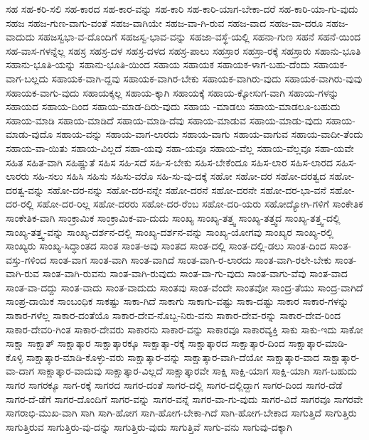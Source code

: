 {ಸಹ
ಸಹ-ಕರಿ-ಸಲಿ
ಸಹ-ಕಾರದ
ಸಹ-ಕಾರ-ವನ್ನು
ಸಹ-ಕಾರಿ
ಸಹ-ಕಾರಿ-ಯಾಗ-ಬೇಕಾ-ದರೆ
ಸಹ-ಕಾರಿ-ಯಾ-ಗು-ವುದು
ಸಹಜ
ಸಹಜ-ಗುಣ-ವಾಗು-ವಂತೆ
ಸಹಜ-ವಾಗಿಯೇ
ಸಹಜ-ವಾ-ಗಿ-ರುವ
ಸಹಜ-ವಾದ
ಸಹಜ-ವಾ-ದರೂ
ಸಹಜ-ವಾದುದು
ಸಹಜಸ್ವಭಾ-ವ-ದೊಂದಿಗೆ
ಸಹಜಸ್ವ-ಭಾವ-ವನ್ನು
ಸಹಜಾ-ವಸ್ಥೆ-ಯಲ್ಲಿ
ಸಹನಾ-ಗುಣ
ಸಹನೆ
ಸಹನೆ-ಯಿಂದ
ಸಹ-ವಾಸ-ಗಳನ್ನೆಲ್ಲ
ಸಹಸ್ರ
ಸಹಸ್ರ-ದಳ
ಸಹಸ್ರ-ದಳದ
ಸಹಸ್ರ-ಪಾಲು
ಸಹಸ್ರಾರ
ಸಹಸ್ರಾ-ರಕ್ಕೆ
ಸಹಸ್ರಾರು
ಸಹಾನು-ಭೂತಿ
ಸಹಾನು-ಭೂತಿ-ಯನ್ನು
ಸಹಾನು-ಭೂತಿ-ಯಿಂದ
ಸಹಾಯ
ಸಹಾಯಕ
ಸಹಾಯಕ-ಳಾಗ-ಬಹು-ದೆಂದು
ಸಹಾಯಕ-ವಾಗ-ಬಲ್ಲದು
ಸಹಾಯಕ-ವಾಗಿ-ದ್ದವು
ಸಹಾಯಕ-ವಾಗಿರ-ಬೇಕು
ಸಹಾಯಕ-ವಾಗಿರು-ವುದು
ಸಹಾಯಕ-ವಾಗಿರು-ವುವು
ಸಹಾಯಕ-ವಾಗು-ವುದು
ಸಹಾಯಕ್ಕಲ್ಲ
ಸಹಾಯ-ಕ್ಕಾಗಿ
ಸಹಾಯಕ್ಕೆ
ಸಹಾಯ-ಕ್ಕೋಸುಗ-ವಾಗಿ
ಸಹಾಯ-ಗಳನ್ನು
ಸಹಾಯದ
ಸಹಾಯ-ದಿಂದ
ಸಹಾಯ-ಮಾಡ-ದಿರು-ವುದು
ಸಹಾಯ	-ಮಾಡಲು
ಸಹಾಯ-ಮಾಡಲೂ-ಬಹುದು
ಸಹಾಯ-ಮಾಡಿ
ಸಹಾಯ-ಮಾಡಿದೆ
ಸಹಾಯ-ಮಾಡಿ-ದೆವು
ಸಹಾಯ-ಮಾಡುವ
ಸಹಾಯ-ಮಾಡು-ವುದು
ಸಹಾಯ-ಮಾಡು-ವುದೊ
ಸಹಾಯ-ವನ್ನು
ಸಹಾಯ-ವಾಗ-ಲಾರದು
ಸಹಾಯ-ವಾಗು
ಸಹಾಯ-ವಾಗುವ
ಸಹಾಯ-ವಾದೀ-ತೆಂದು
ಸಹಾಯ-ವಾ-ಯಿತು
ಸಹಾಯ-ವಿಲ್ಲದೆ
ಸಹಾ-ಯವು
ಸಹಾ-ಯವೂ
ಸಹಾಯ-ವೆಲ್ಲ
ಸಹಾಯ-ವೆಲ್ಲವೂ
ಸಹಾ-ಯವೇ
ಸಹಿತ
ಸಹಿತ-ವಾಗಿ
ಸಹಿಷ್ಣುತೆ
ಸಹಿಸ
ಸಹಿ-ಸದೆ
ಸಹಿ-ಸ-ಬೇಕು
ಸಹಿಸ-ಬೇಕೆಂದೂ
ಸಹಿಸ-ಲಾರ
ಸಹಿಸ-ಲಾರದ
ಸಹಿಸ-ಲಾರರು
ಸಹಿ-ಸಲು
ಸಹಿಸಿ
ಸಹಿಸು
ಸಹಿಸು-ವರೊ
ಸಹಿ-ಸು-ವು-ದಕ್ಕೆ
ಸಹೋ
ಸಹೋ-ದರ
ಸಹೋ-ದರತ್ವದ
ಸಹೋ-ದರತ್ವ-ವನ್ನು
ಸಹೋ-ದರ-ನನ್ನು
ಸಹೋ-ದರ-ನನ್ನೇ
ಸಹೋ-ದರನೆ
ಸಹೋ-ದರನೇ
ಸಹೋ-ದರ-ಭಾ-ವನೆ
ಸಹೋ-ದರ-ರಲ್ಲಿ
ಸಹೋ-ದರ-ರಿಲ್ಲ
ಸಹೋ-ದರರು
ಸಹೋ-ದರ-ರೆಂಬ
ಸಹೋ-ದರಿ-ಯರು
ಸಹೋದ್ಯೋಗಿ-ಗಳಿಗೆ
ಸಾಂಕೇತಿಕ
ಸಾಂಕೇತಿಕ-ವಾಗಿ
ಸಾಂಕ್ರಾಮಿಕ
ಸಾಂಕ್ರಾಮಿಕ-ವಾ-ದುದು
ಸಾಂಖ್ಯ
ಸಾಂಖ್ಯ-ತತ್ತ್ವ
ಸಾಂಖ್ಯ-ತತ್ತ್ವದ
ಸಾಂಖ್ಯ-ತತ್ತ್ವ-ದಲ್ಲಿ
ಸಾಂಖ್ಯ-ತತ್ತ್ವ-ವನ್ನು
ಸಾಂಖ್ಯ-ದರ್ಶನ-ದಲ್ಲಿ
ಸಾಂಖ್ಯ-ದರ್ಶನ-ವನ್ನು
ಸಾಂಖ್ಯ-ಯೋಗವು
ಸಾಂಖ್ಯರ
ಸಾಂಖ್ಯ-ರಲ್ಲಿ
ಸಾಂಖ್ಯರು
ಸಾಂಖ್ಯ-ಸಿದ್ಧಾಂತದ
ಸಾಂತ
ಸಾಂತ-ಅವು
ಸಾಂತದ
ಸಾಂತ-ದಲ್ಲಿ
ಸಾಂತ-ದಲ್ಲಿ-ಡಲು
ಸಾಂತ-ದಿಂದ
ಸಾಂತ-ವಸ್ತು-ಗಳಿಂದ
ಸಾಂತ-ವಾಗ
ಸಾಂತ-ವಾಗಿ
ಸಾಂತ-ವಾಗಿದೆ
ಸಾಂತ-ವಾಗಿ-ರ-ಲಾರದು
ಸಾಂತ-ವಾಗಿ-ರಲೇ-ಬೇಕು
ಸಾಂತ-ವಾಗಿ-ರುವ
ಸಾಂತ-ವಾಗಿ-ರುವನು
ಸಾಂತ-ವಾಗಿ-ರುವುದು
ಸಾಂತ-ವಾ-ಗು-ವುದು
ಸಾಂತ-ವಾಗು-ವೆವು
ಸಾಂತ-ವಾದ
ಸಾಂತ-ವಾ-ದದ್ದು
ಸಾಂತ-ವಾದು
ಸಾಂತ-ವಾದುದು
ಸಾಂತವು
ಸಾಂತ-ವೆಂದೇ
ಸಾಂತವೋ
ಸಾಂದ್ರ-ತೆಯು
ಸಾಂದ್ರ-ವಾಗಿದೆ
ಸಾಂಪ್ರ-ದಾಯಿಕ
ಸಾಂಬಂಧಿಕ
ಸಾಕಷ್ಟು
ಸಾಕಾ-ಗಿದೆ
ಸಾಕಾಗು
ಸಾಕಾಗು-ವಷ್ಟು
ಸಾಕಾ-ದಷ್ಟು
ಸಾಕಾರ
ಸಾಕಾರ-ಗಳನ್ನು
ಸಾಕಾರ-ಗಳೆಲ್ಲ
ಸಾಕಾರ-ದಂತೆಯೊ
ಸಾಕಾರ-ದೇವ-ನೊಬ್ಬ-ನಿರು-ವನು
ಸಾಕಾರ-ದೇವ-ರನ್ನು
ಸಾಕಾರ-ದೇವ-ರಿಂದ
ಸಾಕಾರ-ದೇವರಿ-ಗಿಂತ
ಸಾಕಾರ-ದೇವರು
ಸಾಕಾರನು
ಸಾಕಾರ-ವನ್ನು
ಸಾಕಾರವೂ
ಸಾಕಾರವ್ಯಕ್ತಿ
ಸಾಕು
ಸಾಕು-ಇದು
ಸಾಕೋ
ಸಾಕ್ಷಾ
ಸಾಕ್ಷಾತ್
ಸಾಕ್ಷಾತ್ಕಾರ
ಸಾಕ್ಷಾತ್ಕಾರಕ್ಕೂ
ಸಾಕ್ಷಾತ್ಕಾ-ರಕ್ಕೆ
ಸಾಕ್ಷಾತ್ಕಾರದ
ಸಾಕ್ಷಾತ್ಕಾರ-ದಿಂದ
ಸಾಕ್ಷಾತ್ಕಾರ-ಮಾಡಿ-ಕೊಳ್ಳಿ
ಸಾಕ್ಷಾತ್ಕಾರ-ಮಾಡಿ-ಕೊಳ್ಳು-ವರು
ಸಾಕ್ಷಾತ್ಕಾರ-ವನ್ನು
ಸಾಕ್ಷಾತ್ಕಾರ-ವಾಗಿ-ದೆಯೋ
ಸಾಕ್ಷಾತ್ಕಾರ-ವಾದ
ಸಾಕ್ಷಾತ್ಕಾರ-ವಾ-ದಾಗ
ಸಾಕ್ಷಾತ್ಕಾರ-ವಾದುವು
ಸಾಕ್ಷಾತ್ಕಾರ-ವಿಲ್ಲದೆ
ಸಾಕ್ಷಾತ್ಕಾರವೇ
ಸಾಕ್ಷಿ
ಸಾಕ್ಷಿ-ಯಾಗ
ಸಾಕ್ಷಿ-ಯಾಗಿ
ಸಾಗ-ಬಹುದು
ಸಾಗರ
ಸಾಗರಕ್ಕೂ
ಸಾಗ-ರಕ್ಕೆ
ಸಾಗರದ
ಸಾಗರ-ದಂತೆ
ಸಾಗರ-ದಲ್ಲಿ
ಸಾಗರ-ದಲ್ಲಿದ್ದಾಗ
ಸಾಗರ-ದಿಂದ
ಸಾಗರ-ದೆಡೆ
ಸಾಗರ-ದೆ-ಡೆಗೆ
ಸಾಗರ-ದೊಂದಿಗೆ
ಸಾಗರ-ವನ್ನು
ಸಾಗರ-ವನ್ನೆ
ಸಾಗರ-ವಾ-ಗು-ವುದು
ಸಾಗರ-ವಿದೆ
ಸಾಗರವೂ
ಸಾಗರವೇ
ಸಾಗರಾಭಿ-ಮುಖ-ವಾಗಿ
ಸಾಗಿ
ಸಾಗಿ-ಹೋಗ
ಸಾಗಿ-ಹೋಗ-ಬೇಕಾ-ಗಿದೆ
ಸಾಗಿ-ಹೋಗ-ಬೇಕಾದ
ಸಾಗುತ್ತಿದೆ
ಸಾಗುತ್ತಿರು
ಸಾಗುತ್ತಿರುವ
ಸಾಗುತ್ತಿರು-ವು-ದನ್ನು
ಸಾಗುತ್ತಿರು-ವುದು
ಸಾಗುತ್ತಿವೆ
ಸಾಗು-ವನು
ಸಾಗುವು-ದಕ್ಕಾಗಿ
}
